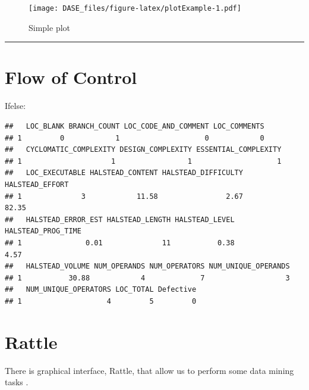 \documentclass[]{book}
\newenvironment{Shaded}{\begin{snugshade}}{\end{snugshade}}
\newcommand{\KeywordTok}[1]{\textcolor[rgb]{0.13,0.29,0.53}{\textbf{{#1}}}}
\newcommand{\DecValTok}[1]{\textcolor[rgb]{0.00,0.00,0.81}{{#1}}}
\newcommand{\StringTok}[1]{\textcolor[rgb]{0.31,0.60,0.02}{{#1}}}
\newcommand{\NormalTok}[1]{{#1}}
\begin{document}
\begin{figure}[htbp]
\centering
\texttt{[image: DASE\_files/figure-latex/plotExample-1.pdf]}
\caption{\label{fig:plotExample}Simple plot}
\end{figure}

\begin{center}\rule{0.5\linewidth}{\linethickness}\end{center}

\section{Flow of Control}\label{flow-of-control}

Ifelse:

\begin{Shaded}
\end{Shaded}

\begin{verbatim}
##   LOC_BLANK BRANCH_COUNT LOC_CODE_AND_COMMENT LOC_COMMENTS
## 1         0            1                    0            0
##   CYCLOMATIC_COMPLEXITY DESIGN_COMPLEXITY ESSENTIAL_COMPLEXITY
## 1                     1                 1                    1
##   LOC_EXECUTABLE HALSTEAD_CONTENT HALSTEAD_DIFFICULTY HALSTEAD_EFFORT
## 1              3            11.58                2.67           82.35
##   HALSTEAD_ERROR_EST HALSTEAD_LENGTH HALSTEAD_LEVEL HALSTEAD_PROG_TIME
## 1               0.01              11           0.38               4.57
##   HALSTEAD_VOLUME NUM_OPERANDS NUM_OPERATORS NUM_UNIQUE_OPERANDS
## 1           30.88            4             7                   3
##   NUM_UNIQUE_OPERATORS LOC_TOTAL Defective
## 1                    4         5         0
\end{verbatim}

\section{Rattle}\label{rattle}

There is graphical interface, Rattle, that allow us to perform some data
mining tasks \citep{Williams11}.
\end{document}
